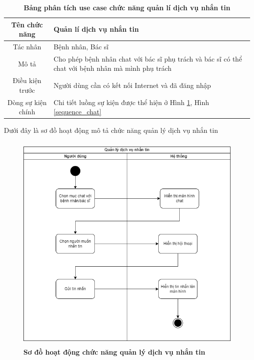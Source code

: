   \begin{table}[H]
    \caption{\bfseries \fontsize{12pt}{0pt}\selectfont Bảng phân tích use case chức năng quản lí dịch vụ nhắn tin}
    \centering
    \begin{tabularx}{0.9\textwidth}{|c|X|}
      \hline
      \textbf{Tên chức năng} & \textbf{Quản lí dịch vụ nhắn tin} \\
      \hline
      Tác nhân & Bệnh nhân, Bác sĩ \\
      \hline
      Mô tả & Cho phép bệnh nhân chat với bác sĩ phụ trách và bác sĩ có thể chat với bệnh nhân mà mình phụ trách \\
      \hline
      Điều kiện trước & Người dùng cần có kết nối Internet và đã đăng nhập \\
      \hline
      Dòng sự kiện chính & 
        Chi tiết luồng sự kiện được thể hiện ở Hình \ref{activity_chat}, Hình \ref{sequence_chat} 
        \\
      \hline
    \end{tabularx}
  \end{table}
  Dưới đây là sơ đồ hoạt động mô tả chức năng quản lý dịch vụ nhắn tin
  \begin{figure}[H]
    \centering
    \includegraphics[width=11.5cm,height=11cm]{Images/activity/activity_chat.png}
    \caption[Sơ đồ hoạt động chức năng quản lý dịch vụ nhắn tin]{\bfseries \fontsize{12pt}{0pt}
    \selectfont Sơ đồ hoạt động chức năng quản lý dịch vụ nhắn tin}
    \label{activity_chat} %
  \end{figure}


